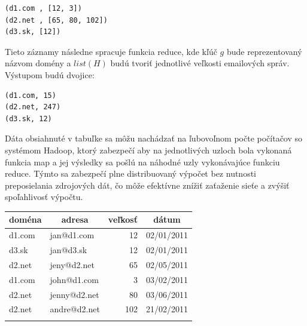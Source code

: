 \documentclass[11pt,twoside,a4paper]{book}
\begin{document}
\begin{verbatim}
(d1.com , [12, 3])
(d2.net , [65, 80, 102])
(d3.sk, [12])
\end{verbatim}

Tieto záznamy následne spracuje funkcia reduce, kde kľúč $g$ bude reprezentovaný názvom domény a $list(H)$ budú tvoriť jednotlivé veľkosti emailových správ. Výstupom budú dvojice:

\begin{verbatim}
(d1.com, 15)
(d2.net, 247)
(d3.sk, 12)
\end{verbatim}

Dáta obsiahnuté v tabuľke sa môžu nachádzať na ľubovoľnom počte počítačov so systémom Hadoop, ktorý zabezpečí aby na jednotlivých uzloch bola vykonaná funkcia map a jej výsledky sa pošlú na náhodné uzly vykonávajúce funkciu reduce. Týmto sa zabezpečí plne distribuovaný výpočet bez nutnosti preposielania zdrojových dát, čo môže efektívne znížiť zaťaženie sieťe a zvýšiť spoľahlivosť výpočtu.


{\centering%
\label{tab:001}\par\bigskip
\begin{tabular}{llrl}\toprule
  \multicolumn{1}{c}{doména} & \multicolumn{1}{c}{adresa} & \multicolumn{1}{c}{veľkosť} &\multicolumn{1}{c}{dátum}\\\midrule\addlinespace
    d1.com & jan@d1.com & 12 & 02/01/2011\\\addlinespace    
    d3.sk  & jan@d3.sk & 12 & 02/01/2011\\\addlinespace
    d2.net & jeny@d2.net & 65 & 02/05/2011\\\addlinespace
    d1.com & john@d1.com & 3 & 03/02/2011\\\addlinespace
    d2.net & jenny@d2.net & 80 & 03/06/2011\\\addlinespace
    d2.net & andre@d2.net & 102 & 21/02/2011\\\addlinespace
 \hline
\end{tabular}\\}
\label{tab:mapred}
\par\bigskip



% 
\end{document}
